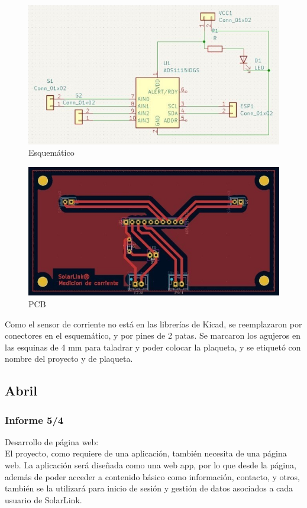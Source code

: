 \begin{figure}[H]
    \centering
    \includegraphics[width=0.75\linewidth]{informes/Screenshot_16.jpg}
    \caption{Esquemático}
\end{figure}

\begin{figure}[H]
    \centering
    \includegraphics[width=0.75\linewidth]{informes/Screenshot_17.jpg}
    \caption{PCB}
\end{figure}

Como el sensor de corriente no está en las librerías de Kicad, se reemplazaron por conectores en el esquemático, y por pines de 2 patas. Se marcaron los agujeros en las esquinas de 4 mm para taladrar y poder colocar la plaqueta, y se etiquetó con nombre del proyecto y de plaqueta.\\

\subsection{Abril}

\subsubsection{Informe 5/4}

Desarrollo de página web:\\

El proyecto, como requiere de una aplicación, también necesita de una página web. La aplicación será diseñada como una web app, por lo que desde la página, además de poder acceder a contenido básico como información, contacto, y otros, también se la utilizará para inicio de sesión y gestión de datos asociados a cada usuario de SolarLink.\\

